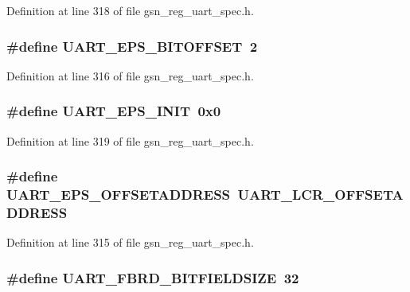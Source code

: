 Definition at line 318 of file gsn\_\-reg\_\-uart\_\-spec.h.

\hypertarget{a00575_a4d2a78cef68208a93e7f34879cc6a089}{
\subsubsection[{UART\_\-EPS\_\-BITOFFSET}]{\setlength{\rightskip}{0pt plus 5cm}\#define UART\_\-EPS\_\-BITOFFSET~2}}
\label{a00575_a4d2a78cef68208a93e7f34879cc6a089}


Definition at line 316 of file gsn\_\-reg\_\-uart\_\-spec.h.

\hypertarget{a00575_a96d0bdb9b0972cb72eb91ef5b9fdf98a}{
\subsubsection[{UART\_\-EPS\_\-INIT}]{\setlength{\rightskip}{0pt plus 5cm}\#define UART\_\-EPS\_\-INIT~0x0}}
\label{a00575_a96d0bdb9b0972cb72eb91ef5b9fdf98a}


Definition at line 319 of file gsn\_\-reg\_\-uart\_\-spec.h.

\hypertarget{a00575_a8c9c1d92586929438b0e6a29f0c33543}{
\subsubsection[{UART\_\-EPS\_\-OFFSETADDRESS}]{\setlength{\rightskip}{0pt plus 5cm}\#define UART\_\-EPS\_\-OFFSETADDRESS~UART\_\-LCR\_\-OFFSETADDRESS}}
\label{a00575_a8c9c1d92586929438b0e6a29f0c33543}


Definition at line 315 of file gsn\_\-reg\_\-uart\_\-spec.h.

\hypertarget{a00575_a44902619bd95edbe441b50b625816f6b}{
\subsubsection[{UART\_\-FBRD\_\-BITFIELDSIZE}]{\setlength{\rightskip}{0pt plus 5cm}\#define UART\_\-FBRD\_\-BITFIELDSIZE~32}}
\label{a00575_a44902619bd95edbe441b50b625816f6b}


